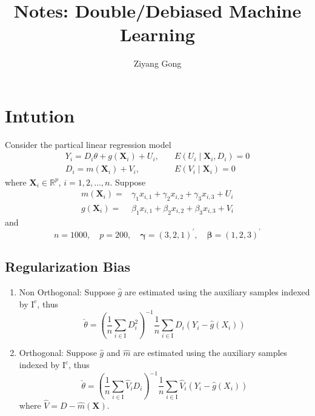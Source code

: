 \documentclass[en,mtpro2]{elegantpaper}
\title{Notes: Double/Debiased Machine Learning}
\author{Ziyang Gong}
\begin{document}
\maketitle

\section{Intution}

Consider the partical linear regression model
\begin{equation}
    \begin{aligned}
        Y_{i}=D_{i}\theta+g(\mathbf{X}_{i})+U_{i}, & \quad E\left(U_{i}\mid\mathbf{X}_{i},D_{i}\right)=0 \\
        D_{i}=m(\mathbf{X}_{i})+V_{i},             & \quad E\left(V_{i}\mid\mathbf{X}_{i}\right)=0
    \end{aligned}
\end{equation}
where $\mathbf{X}_{i}\in\mathbb{R}^{p}$, $i=1,2,\ldots,n$. Suppose
\begin{equation}
    \begin{aligned}
        m(\mathbf{X}_{i})= & \gamma_{1}x_{i,1}+\gamma_{2}x_{i,2}+\gamma_{3}x_{i,3}+U_{i} \\
        g(\mathbf{X}_{i})= & \beta_{1}x_{i,1}+\beta_{2}x_{i,2}+\beta_{3}x_{i,3}+V_{i}
    \end{aligned}
\end{equation}
and
\begin{equation*}
    n=1000,\quad p=200,\quad\boldsymbol{\gamma}=\left(3,2,1\right)^{\prime},\quad\boldsymbol{\beta}=\left(1,2,3\right)^{\prime}
\end{equation*}

\subsection{Regularization Bias}

\begin{enumerate}
    \item Non Orthogonal: Suppose $\hat{g}$ are estimated using the auxiliary samples indexed by $\mathrm{I}^{c}$, thus
          \begin{equation}
              \check{\theta}=\left(\frac{1}{n}\sum_{i\in\mathrm{I}}D_{i}^{2}\right)^{-1}\frac{1}{n}\sum_{i\in\mathrm{I}}D_{i}\left(Y_{i}-\hat{g}\left(X_{i}\right)\right)
          \end{equation}
    \item Orthogonal:  Suppose $\hat{g}$ and $\hat{m}$ are estimated using the auxiliary samples indexed by $\mathrm{I}^{c}$, thus
          \begin{equation}
              \check{\theta}=\left(\frac{1}{n}\sum_{i\in\mathrm{I}}\widehat{V}_{i}D_{i}\right)^{-1}\frac{1}{n}\sum_{i\in\mathrm{I}}\hat{V}_{i}\left(Y_{i}-\hat{g}\left(X_{i}\right)\right)
          \end{equation}
          where $\hat{V}=D-\hat{m}(\mathbf{X})$.
\end{enumerate}
\end{document}
